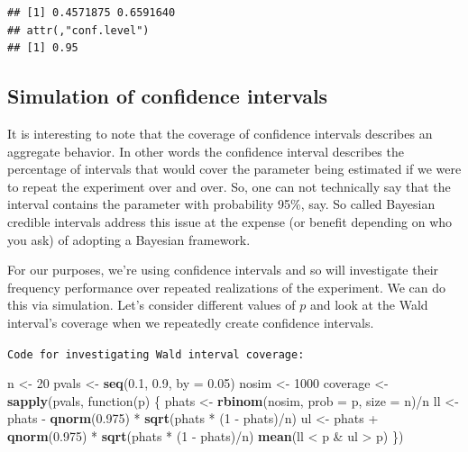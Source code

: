\documentclass[]{article}
\newenvironment{Shaded}{\begin{snugshade}}{\end{snugshade}}
\newcommand{\KeywordTok}[1]{\textcolor[rgb]{0.13,0.29,0.53}{\textbf{{#1}}}}
\newcommand{\DataTypeTok}[1]{\textcolor[rgb]{0.13,0.29,0.53}{{#1}}}
\newcommand{\DecValTok}[1]{\textcolor[rgb]{0.00,0.00,0.81}{{#1}}}
\newcommand{\FloatTok}[1]{\textcolor[rgb]{0.00,0.00,0.81}{{#1}}}
\newcommand{\StringTok}[1]{\textcolor[rgb]{0.31,0.60,0.02}{{#1}}}
\newcommand{\NormalTok}[1]{{#1}}
\begin{document}
\begin{verbatim}
## [1] 0.4571875 0.6591640
## attr(,"conf.level")
## [1] 0.95
\end{verbatim}

\subsection{Simulation of confidence
intervals}\label{simulation-of-confidence-intervals}

It is interesting to note that the coverage of confidence intervals
describes an aggregate behavior. In other words the confidence interval
describes the percentage of intervals that would cover the parameter
being estimated if we were to repeat the experiment over and over. So,
one can not technically say that the interval contains the parameter
with probability 95\%, say. So called Bayesian credible intervals
address this issue at the expense (or benefit depending on who you ask)
of adopting a Bayesian framework.

For our purposes, we're using confidence intervals and so will
investigate their frequency performance over repeated realizations of
the experiment. We can do this via simulation. Let's consider different
values of $p$ and look at the Wald interval's coverage when we
repeatedly create confidence intervals.

\vspace{1pc}

\verb;Code for investigating Wald interval coverage:;

\begin{Shaded}
\begin{Highlighting}[]
\NormalTok{n <-}\StringTok{ }\DecValTok{20}
\NormalTok{pvals <-}\StringTok{ }\KeywordTok{seq}\NormalTok{(}\FloatTok{0.1}\NormalTok{, }\FloatTok{0.9}\NormalTok{, }\DataTypeTok{by =} \FloatTok{0.05}\NormalTok{)}
\NormalTok{nosim <-}\StringTok{ }\DecValTok{1000}
\NormalTok{coverage <-}\StringTok{ }\KeywordTok{sapply}\NormalTok{(pvals, function(p) \{}
    \NormalTok{phats <-}\StringTok{ }\KeywordTok{rbinom}\NormalTok{(nosim, }\DataTypeTok{prob =} \NormalTok{p, }\DataTypeTok{size =} \NormalTok{n)/n}
    \NormalTok{ll <-}\StringTok{ }\NormalTok{phats -}\StringTok{ }\KeywordTok{qnorm}\NormalTok{(}\FloatTok{0.975}\NormalTok{) *}\StringTok{ }\KeywordTok{sqrt}\NormalTok{(phats *}\StringTok{ }\NormalTok{(}\DecValTok{1} \NormalTok{-}\StringTok{ }\NormalTok{phats)/n)}
    \NormalTok{ul <-}\StringTok{ }\NormalTok{phats +}\StringTok{ }\KeywordTok{qnorm}\NormalTok{(}\FloatTok{0.975}\NormalTok{) *}\StringTok{ }\KeywordTok{sqrt}\NormalTok{(phats *}\StringTok{ }\NormalTok{(}\DecValTok{1} \NormalTok{-}\StringTok{ }\NormalTok{phats)/n)}
    \KeywordTok{mean}\NormalTok{(ll <}\StringTok{ }\NormalTok{p &}\StringTok{ }\NormalTok{ul >}\StringTok{ }\NormalTok{p)}
\NormalTok{\})}
\end{Highlighting}
\end{Shaded}
\end{document}
